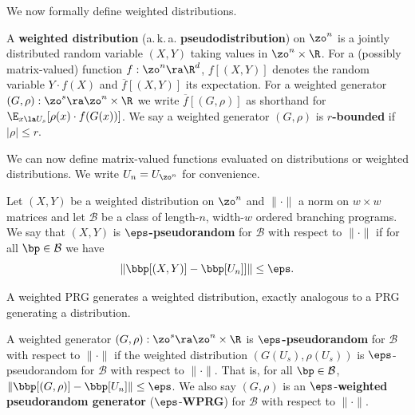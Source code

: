 \documentclass{toc}
\begin{document}
We now formally %
define  %
weighted distributions.
\begin{definition}
A \textbf{weighted distribution} %
(a.\,k.\,a.  %
\textbf{pseudodistribution}) on $\zo^n$ is a jointly distributed random variable $(X,Y)$ taking values in $\zo^n\times \R$. For a (possibly %
matrix-valued) %
function $f:\zo^n\ra\R^d$, $f[(X,Y)]$ denotes the random variable $Y\cdot f(X)$ and $\overline{f}[(X,Y)]$ its expectation. For a weighted generator $(G,\rho):\zo^s\ra \zo^n\times \R$ we write $\overline{f}[(G,\rho)]$ as shorthand for $\E_{x\la U_s}[\rho(x)\cdot f(G(x))]$. We say a weighted generator $(G,\rho)$ is \textbf{$r$-bounded} if $|\rho|\leq r$.
\end{definition}
We can now define %
matrix-valued %
functions evaluated on distributions or weighted distributions. We write $U_n=U_{\zo^n}$ for convenience.
\begin{definition}
    Let $(X,Y)$ be a weighted distribution on $\zo^n$ and $\|\cdot\|$ a norm on $w\times w$ matrices and let $\mathcal{B}$ be a class of %
    length-$n$, width-$w$ %
    ordered branching programs. We say that $(X,Y)$ is \textbf{$\eps$-pseudorandom} for $\mathcal{B}$  with respect to $\|\cdot\|$  if for all $\bp \in \mathcal{B}$ we have
    $$\left\| \bbp[(X,Y)] - \bbp[U_n]]\right\|\leq \eps.$$
\end{definition}
A weighted PRG generates a weighted distribution, exactly analogous to a PRG generating a distribution.
\begin{definition}
A weighted generator $(G,\rho):\zo^s\ra\zo^n\times\R$ is \textbf{$\eps$-pseudorandom} for $\mathcal{B}$ with respect to $\|\cdot\|$ if the weighted distribution $(G(U_s),\rho(U_s))$ is $\eps$-pseudorandom for $\mathcal{B}$ with respect to $\|\cdot\|$. That is, for all $\bp\in \mathcal{B}$, $\|\bbp[(G,\rho)]-\bbp[U_n]\|\leq \eps$. We also say $(G,\rho)$ is an $\eps$-\textbf{weighted pseudorandom generator} ($\eps$-\textbf{WPRG}) for $\mathcal{B}$ with respect to $\|\cdot\|$.
\end{definition}
\end{document}
